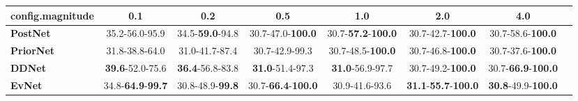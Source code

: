 \begin{tabular}{lccccccc}
\toprule
\textbf{config.magnitude} &                               0.1 &                      0.2 &                                0.5 &                                1.0 &                                         2.0 &                                4.0 \\
\midrule
\textbf{PostNet } &                    35.2-56.0-95.9 &  34.5-\textbf{59.0}-94.8 &           30.7-47.0-\textbf{100.0} &  30.7-\textbf{57.2}-\textbf{100.0} &                    30.7-42.7-\textbf{100.0} &           30.7-58.6-\textbf{100.0} \\
\textbf{PriorNet} &                    31.8-38.8-64.0 &           31.0-41.7-87.4 &                     30.7-42.9-99.3 &           30.7-48.5-\textbf{100.0} &                    30.7-46.8-\textbf{100.0} &           30.7-37.6-\textbf{100.0} \\
\textbf{DDNet   } &           \textbf{39.6}-52.0-75.6 &  \textbf{36.4}-56.8-83.8 &            \textbf{31.0}-51.4-97.3 &            \textbf{31.0}-56.9-97.7 &                    30.7-49.2-\textbf{100.0} &  30.7-\textbf{66.9}-\textbf{100.0} \\
\textbf{EvNet   } &  34.8-\textbf{64.9}-\textbf{99.7} &  30.8-48.9-\textbf{99.8} &  30.7-\textbf{66.4}-\textbf{100.0} &                     30.9-41.6-93.6 &  \textbf{31.1}-\textbf{55.7}-\textbf{100.0} &  \textbf{30.8}-49.9-\textbf{100.0} \\
\bottomrule
\end{tabular}
